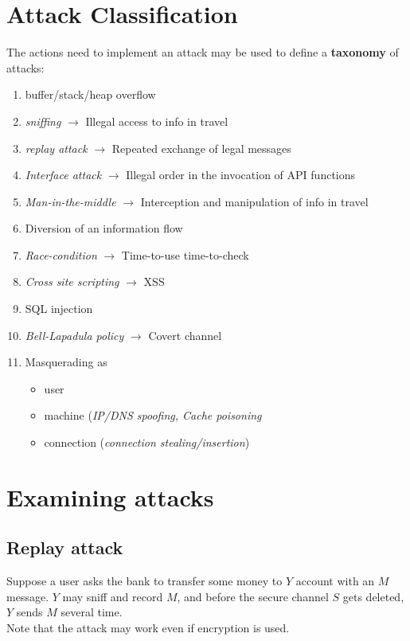 \section{Attack Classification}
\label{sec:attack_taxonomy}
The actions need to implement an attack may be used to define a \textbf{taxonomy} of attacks:
\begin{enumerate}
    \item buffer/stack/heap overflow
    \item \textit{sniffing} $\rightarrow$ Illegal access to info in travel
    \item \textit{replay attack} $\rightarrow$ Repeated exchange of legal messages 
    \item \textit{Interface attack} $\rightarrow$ Illegal order in the invocation of API functions
    \item \textit{Man-in-the-middle} $\rightarrow$ Interception and manipulation of info in travel
    \item Diversion of an information flow
    \item \textit{Race-condition} $\rightarrow$ Time-to-use time-to-check
    \item \textit{Cross site scripting} $\rightarrow$  XSS
    \item SQL injection
    \item \textit{Bell-Lapadula policy} $\rightarrow$ Covert channel 
    \item Masquerading as
    \begin{itemize}
        \item user
        \item machine (\textit{IP/DNS spoofing, Cache poisoning}
        \item connection (\textit{connection stealing/insertion})
    \end{itemize}
\end{enumerate}

\section{Examining attacks}
\subsection*{Replay attack}
Suppose a user asks the bank to transfer some money to $Y$ account with an $M$ message.
$Y$ may sniff and record $M$, and before the secure channel $S$ gets deleted, $Y$ sends $M$ several time.\\
Note that the attack may work even if encryption is used.

